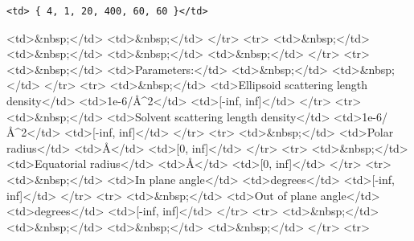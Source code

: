 \begin{verbatim}
<td> { 4, 1, 20, 400, 60, 60 }</td>
\end{verbatim}

\textless{}td\textgreater{}\&nbsp;\textless{}/td\textgreater{} \textless{}td\textgreater{}\&nbsp;\textless{}/td\textgreater{} \textless{}/tr\textgreater{} \textless{}tr\textgreater{} \textless{}td\textgreater{}\&nbsp;\textless{}/td\textgreater{} \textless{}td\textgreater{}\&nbsp;\textless{}/td\textgreater{} \textless{}td\textgreater{}\&nbsp;\textless{}/td\textgreater{} \textless{}td\textgreater{}\&nbsp;\textless{}/td\textgreater{} \textless{}/tr\textgreater{} \textless{}tr\textgreater{} \textless{}td\textgreater{}\&nbsp;\textless{}/td\textgreater{} \textless{}td\textgreater{}Parameters:\textless{}/td\textgreater{} \textless{}td\textgreater{}\&nbsp;\textless{}/td\textgreater{} \textless{}td\textgreater{}\&nbsp;\textless{}/td\textgreater{} \textless{}/tr\textgreater{} \textless{}tr\textgreater{} \textless{}td\textgreater{}\&nbsp;\textless{}/td\textgreater{} \textless{}td\textgreater{}Ellipsoid scattering length density\textless{}/td\textgreater{} \textless{}td\textgreater{}1e-6/\AA{}\textasciicircum{}2\textless{}/td\textgreater{} \textless{}td\textgreater{}[-inf, inf]\textless{}/td\textgreater{} \textless{}/tr\textgreater{} \textless{}tr\textgreater{} \textless{}td\textgreater{}\&nbsp;\textless{}/td\textgreater{} \textless{}td\textgreater{}Solvent scattering length density\textless{}/td\textgreater{} \textless{}td\textgreater{}1e-6/\AA{}\textasciicircum{}2\textless{}/td\textgreater{} \textless{}td\textgreater{}[-inf, inf]\textless{}/td\textgreater{} \textless{}/tr\textgreater{} \textless{}tr\textgreater{} \textless{}td\textgreater{}\&nbsp;\textless{}/td\textgreater{} \textless{}td\textgreater{}Polar radius\textless{}/td\textgreater{} \textless{}td\textgreater{}\AA{}\textless{}/td\textgreater{} \textless{}td\textgreater{}[0, inf]\textless{}/td\textgreater{} \textless{}/tr\textgreater{} \textless{}tr\textgreater{} \textless{}td\textgreater{}\&nbsp;\textless{}/td\textgreater{} \textless{}td\textgreater{}Equatorial radius\textless{}/td\textgreater{} \textless{}td\textgreater{}\AA{}\textless{}/td\textgreater{} \textless{}td\textgreater{}[0, inf]\textless{}/td\textgreater{} \textless{}/tr\textgreater{} \textless{}tr\textgreater{} \textless{}td\textgreater{}\&nbsp;\textless{}/td\textgreater{} \textless{}td\textgreater{}In plane angle\textless{}/td\textgreater{} \textless{}td\textgreater{}degrees\textless{}/td\textgreater{} \textless{}td\textgreater{}[-inf, inf]\textless{}/td\textgreater{} \textless{}/tr\textgreater{} \textless{}tr\textgreater{} \textless{}td\textgreater{}\&nbsp;\textless{}/td\textgreater{} \textless{}td\textgreater{}Out of plane angle\textless{}/td\textgreater{} \textless{}td\textgreater{}degrees\textless{}/td\textgreater{} \textless{}td\textgreater{}[-inf, inf]\textless{}/td\textgreater{} \textless{}/tr\textgreater{} \textless{}tr\textgreater{} \textless{}td\textgreater{}\&nbsp;\textless{}/td\textgreater{} \textless{}td\textgreater{}\&nbsp;\textless{}/td\textgreater{} \textless{}td\textgreater{}\&nbsp;\textless{}/td\textgreater{} \textless{}td\textgreater{}\&nbsp;\textless{}/td\textgreater{} \textless{}/tr\textgreater{} \textless{}tr\textgreater{} 